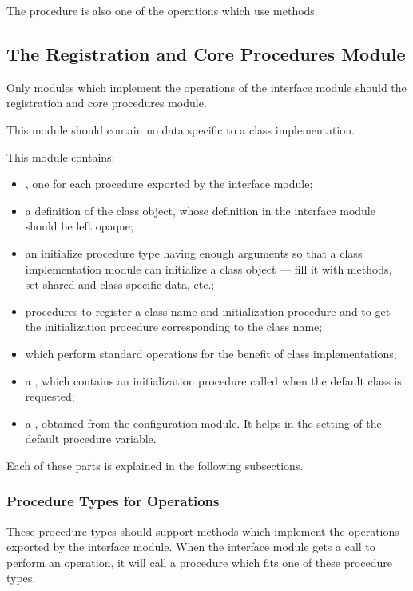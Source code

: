 The  procedure is also one of the operations which use methods.

\subsection{The Registration and Core Procedures Module}

Only modules which implement the operations of the interface module should
 the registration and core procedures module.

This module should contain no data specific to a class implementation.

This module contains:
\begin{itemize}
\item
 , one for each procedure exported by the interface
 module;
\item
 a  definition of the class object, whose definition in the
 interface module should be left opaque;
\item
 an {initialize procedure type} having enough arguments so that
 a class implementation module can initialize a class object --- fill it
 with methods, set shared and class-specific data, etc.;
\item
 procedures to register a class name and initialization procedure and to
 get the initialization procedure corresponding to the class name;
\item
  which perform standard operations for the benefit
 of class implementations;
\item
 a , which contains an initialization
 procedure called when the default class is requested;
\item
 a , obtained from the configuration module.
 It helps in the setting of the default procedure variable.
\end{itemize}

Each of these parts is explained in the following subsections.

\subsubsection{Procedure Types for Operations}

These procedure types should support methods which implement the operations
exported by the interface module.  When the interface module gets a call
to perform an operation, it will call a procedure which fits one of these
procedure types.


